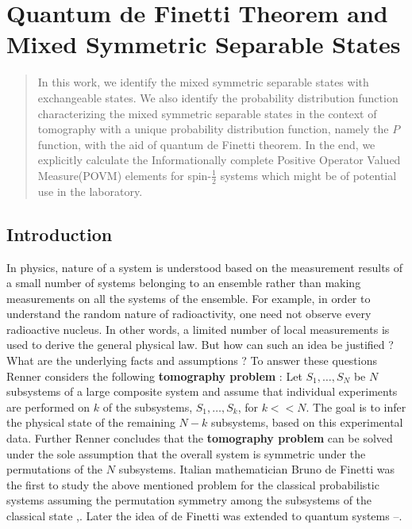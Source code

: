 \chapter[Quantum de Finetti Theorem and Mixed Symmetric Separable States]{Quantum de Finetti Theorem and Mixed Symmetric Separable States}\label{chap27}




\begin{abstract}
In this work, we identify the mixed symmetric separable states with exchangeable states. We also identify the probability distribution function characterizing the mixed symmetric separable states in the context of tomography with a unique probability distribution function, namely the $P$ function, with the aid of quantum de Finetti theorem. In the end, we explicitly calculate the Informationally complete Positive Operator Valued Measure(POVM) elements for spin-$\frac{1}{2}$ systems which might be of potential use in the laboratory.
\end{abstract}

\section{Introduction}\label{chap27-sec1}

In physics, nature of a system is understood based on the measurement results of a small number of systems belonging to an ensemble rather than making measurements on all the systems of the ensemble. For example, in order to understand the random nature of radioactivity, one need not observe every radioactive nucleus. In other words, a limited number of local measurements is used to derive the general physical law. But how can such an idea be justified ? What are the underlying facts and assumptions ? To answer these questions Renner \cite{chap27-key1} considers the following \textbf{tomography problem} : Let $S_{1},\ldots,S_{N}$ be $N$ subsystems of a large composite system and assume that individual experiments are performed on $k$ of the subsystems, $S_{1},\ldots,S_{k}$, for $k<<N$. The goal is to infer the physical state of the remaining $N-k$ subsystems, based on this experimental data. Further Renner\cite{chap27-key1} concludes that the \textbf{tomography problem} can be solved under the sole assumption that the overall system is symmetric under the permutations of the $N$ subsystems. Italian mathematician Bruno de Finetti was the first to study the above mentioned problem for the classical probabilistic systems assuming the permutation symmetry among the subsystems of the classical state \cite{chap27-key2},\cite{chap27-key3}. Later the idea of de Finetti was extended to quantum systems \cite{chap27-key4}--\cite{chap27-key7}.

